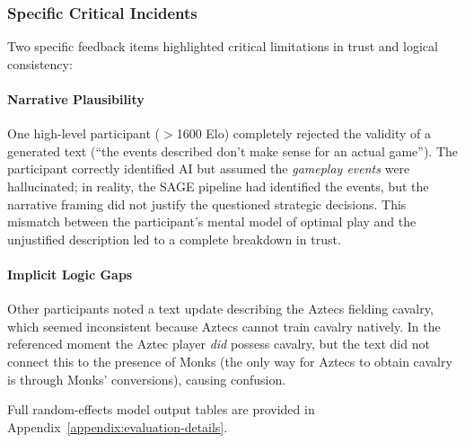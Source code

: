 \subsubsection{Specific Critical Incidents}
Two specific feedback items highlighted critical limitations in trust and logical consistency:

\paragraph{Narrative Plausibility}
One high-level participant ($>$1600 Elo) completely rejected the validity of a generated text (``the events described don't make sense for an actual game''). The participant correctly identified AI but assumed the \textit{gameplay events} were hallucinated; in reality, the SAGE pipeline had identified the events, but the narrative framing did not justify the questioned strategic decisions. This mismatch between the participant's mental model of optimal play and the unjustified description led to a complete breakdown in trust.

\paragraph{Implicit Logic Gaps}
Other participants noted a text update describing the Aztecs fielding cavalry, which seemed inconsistent because Aztecs cannot train cavalry natively. In the referenced moment the Aztec player \textit{did} possess cavalry, but the text did not connect this to the presence of Monks (the only way for Aztecs to obtain cavalry is through Monks' conversions), causing confusion.

Full random-effects model output tables are provided in Appendix~\ref{appendix:evaluation-details}.

